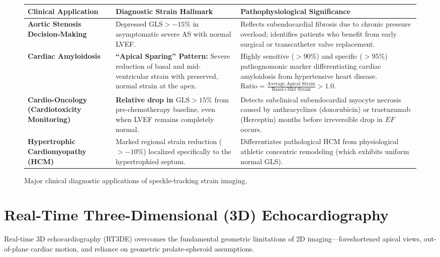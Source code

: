 \documentclass[11pt,a4paper]{article}
\begin{document}
\begin{figure}[htbp]
\centering
\setlength{\tabcolsep}{4pt}
\begin{tabular}{p{3.8cm}p{5.5cm}p{5.5cm}}
\toprule
\textbf{Clinical Application} & \textbf{Diagnostic Strain Hallmark} & \textbf{Pathophysiological Significance} \\
\midrule
\textbf{Aortic Stenosis Decision-Making} & Depressed $\text{GLS} > -15\%$ in asymptomatic severe AS with normal LVEF. & Reflects subendocardial fibrosis due to chronic pressure overload; identifies patients who benefit from early surgical or transcatheter valve replacement. \\
\addlinespace
\textbf{Cardiac Amyloidosis} & \textbf{``Apical Sparing'' Pattern:} Severe reduction of basal and mid-ventricular strain with preserved, normal strain at the apex. & Highly sensitive ($> 90\%$) and specific ($> 95\%$) pathognomonic marker differentiating cardiac amyloidosis from hypertensive heart disease. $\text{Ratio} = \frac{\text{Average Apical Strain}}{\text{Basal} + \text{Mid Strain}} > 1.0$. \\
\addlinespace
\textbf{Cardio-Oncology (Cardiotoxicity Monitoring)} & \textbf{Relative drop in $\text{GLS} > 15\%$} from pre-chemotherapy baseline, even when LVEF remains completely normal. & Detects subclinical subendocardial myocyte necrosis caused by anthracyclines (doxorubicin) or trastuzumab (Herceptin) months before irreversible drop in $EF$ occurs. \\
\addlinespace
\textbf{Hypertrophic Cardiomyopathy (HCM)} & Marked regional strain reduction ($> -10\%$) localized specifically to the hypertrophied septum. & Differentiates pathological HCM from physiological athletic concentric remodeling (which exhibits uniform normal GLS). \\
\bottomrule
\end{tabular}
\caption{Major clinical diagnostic applications of speckle-tracking strain imaging.}
\label{tab:gls_applications}
\end{figure}

\newpage
\section{Real-Time Three-Dimensional (3D) Echocardiography}

Real-time 3D echocardiography (RT3DE) overcomes the fundamental geometric limitations of 2D imaging—foreshortened apical views, out-of-plane cardiac motion, and reliance on geometric prolate-spheroid assumptions.
\end{document}
